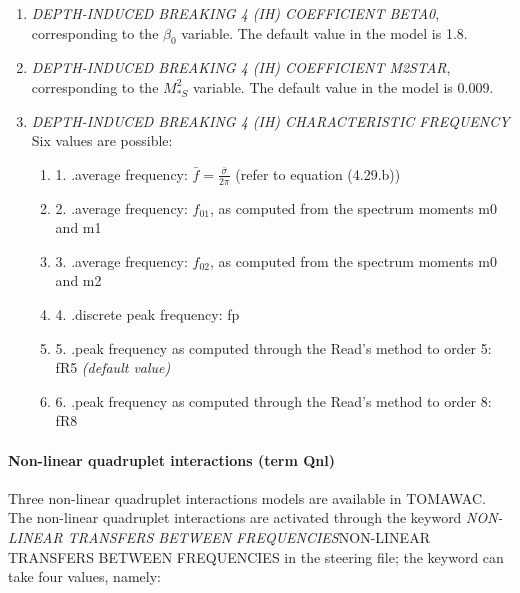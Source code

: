 \begin{enumerate}
\item  \textit{DEPTH-INDUCED BREAKING 4 (IH) COEFFICIENT BETA0}, corresponding to the $\beta _{0} $ variable. The default value in the model is 1.8.

\item  \textit{DEPTH-INDUCED BREAKING 4 (IH) COEFFICIENT M2STAR}, corresponding to the $M_{*S}^{2} $ variable. The default value in the model is 0.009.

 \item \textit{DEPTH-INDUCED BREAKING 4 (IH) CHARACTERISTIC FREQUENCY} Six values are possible:
\begin{enumerate}

 \item 1. .average frequency: $\bar{f}=\frac{\bar{\sigma }}{2\pi } $  (refer to equation (4.29.b))

 \item 2. .average frequency: $f_{01} $, as computed from the spectrum moments m0 and m1

 \item 3. .average frequency: $f_{02} $, as computed from the spectrum moments m0 and m2

 \item 4. .discrete peak frequency: fp

 \item 5. .peak frequency as computed through the Read's method to order 5: fR5 \textit{(default value)}

 \item 6. .peak frequency as computed through the Read's method to order 8: fR8
\end{enumerate}
\end{enumerate}


\paragraph{ Non-linear quadruplet interactions (term Qnl)}

 Three non-linear quadruplet interactions models are available in TOMAWAC. The non-linear quadruplet interactions are activated through the keyword \textit{NON-LINEAR TRANSFERS BETWEEN FREQUENCIES}NON-LINEAR TRANSFERS BETWEEN FREQUENCIES\textit{ }in the steering file; the keyword can take four values, namely:


